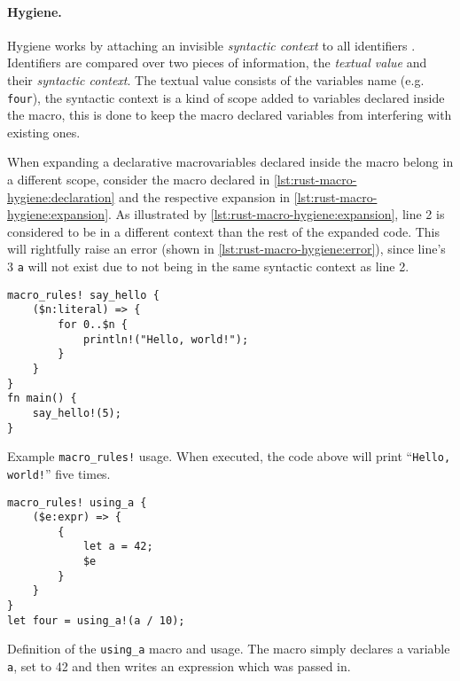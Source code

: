 \paragraph{Hygiene.}
Hygiene works by attaching an invisible \emph{syntactic context} to all identifiers \autocite{Wirth2021}.
Identifiers are compared over two pieces of information,
the \emph{textual value} and their \emph{syntactic context}.
The textual value consists of the variables name (e.g. \texttt{four}),
the syntactic context is a kind of scope added to variables declared inside the macro,
this is done to keep the macro declared variables from interfering with existing ones.

When expanding a declarative macro\footnotemark variables declared inside the macro belong in a different scope,
consider the macro declared in \autoref{lst:rust-macro-hygiene:declaration} and
the respective expansion in \autoref{lst:rust-macro-hygiene:expansion}.
As illustrated by \autoref{lst:rust-macro-hygiene:expansion},
line 2 is considered to be in a different context than the rest of the expanded code.
This will rightfully raise an error (shown in \autoref{lst:rust-macro-hygiene:error}),
since line's 3 \texttt{a} will not exist due to not being in the same syntactic context as line 2.


\begin{listing}
    \centering
    \begin{verbatim}
macro_rules! say_hello {
    ($n:literal) => {
        for 0..$n {
            println!("Hello, world!");
        }
    }
}
fn main() {
    say_hello!(5);
}
    \end{verbatim}
    \caption{Example \texttt{macro\_rules!} usage.
        When executed, the code above will print “\texttt{Hello, world!}” five times.}
    \label{lst:rust-macro-rules}
\end{listing}


\begin{listing}
    \begin{verbatim}
macro_rules! using_a {
    ($e:expr) => {
        {
            let a = 42;
            $e
        }
    }
}
let four = using_a!(a / 10);
    \end{verbatim}
    \caption{
        Definition of the \texttt{using\_a} macro and usage.
        The macro simply declares a variable \texttt{a},
        set to 42 and then writes an expression which was passed in.
    }
    \label{lst:rust-macro-hygiene:declaration}
\end{listing}

